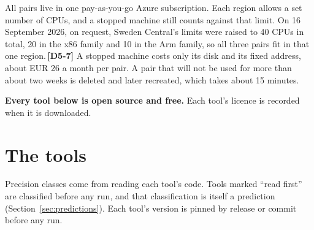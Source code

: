 \documentclass[11pt]{article}
\newcommand{\chgold}[1]{\,{\color{oldcol}\bfseries\footnotesize[#1]}}
\begin{document}
All pairs live in one pay-as-you-go Azure subscription. Each region allows a set number of CPUs, and a stopped machine still counts against that limit. On 16 September 2026, on request, Sweden Central's limits were raised to 40 CPUs in total, 20 in the x86 family and 10 in the Arm family, so all three pairs fit in that one region.\chgold{D5-7} A stopped machine costs only its disk and its fixed address, about EUR 26 a month per pair. A pair that will not be used for more than about two weeks is deleted and later recreated, which takes about 15 minutes.

\textbf{Every tool below is open source and free.} Each tool's licence is recorded when it is downloaded.

\section{The tools}\label{sec:tools}
Precision classes come from reading each tool's code. Tools marked ``read first'' are classified before any run, and that classification is itself a prediction (Section~\ref{sec:predictions}). Each tool's version is pinned by release or commit before any run.
\end{document}
